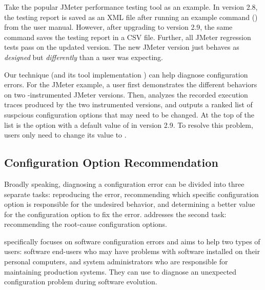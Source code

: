 Take the popular JMeter performance testing tool as an example.
In version 2.8, the testing report is saved as an XML
file after running an example command ()
from the user manual.
However, after upgrading to version 2.9, 
the same command saves the testing report
in a CSV file. Further, all JMeter regression tests pass 
on the updated version.  The new JMeter version
just behaves as \textit{designed} but \textit{differently}
than a user was expecting.



Our technique (and its tool implementation \ourtool) can help
diagnose configuration errors. For the JMeter example,
a user first demonstrates the different
behaviors on two \ourtool-instrumented
JMeter versions. Then, \ourtool analyzes the
recorded execution traces produced by the two instrumented
versions, and outputs a ranked list of suspcious configuration options
that may need to be changed.
At the top of the list is the
 option with a default value of 
in version 2.9.
To resolve this problem, users only need to change
its value to .

\vspace{-1mm}

\subsection{Configuration Option Recommendation}

Broadly speaking, diagnosing a configuration
error can be divided into three separate tasks:
reproducing the error, recommending which specific
configuration option is responsible for the undesired
behavior, and determining a better value for the
configuration option to fix the error. \ourtool addresses
the second task: recommending the root-cause configuration options.

\ourtool specifically focuses on software configuration errors and
aims to help two types of users: software end-users
who may have problems with software installed on their
personal computers, and system administrators who are
responsible for maintaining production systems.
They can use \ourtool to diagnose an unexpected configuration
problem during software evolution. 

